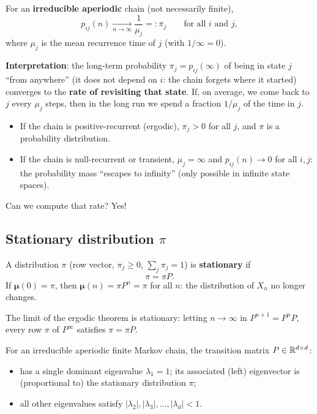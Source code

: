 \begin{theorem}
For an \textbf{irreducible aperiodic} chain (not necessarily finite),
\[
p_{ij}(n) \xrightarrow[n\to\infty]{} \frac{1}{\mu_j} =: \pi_j \qquad \text{for all } i \text{ and } j,
\]
where $\mu_j$ is the mean recurrence time of $j$ (with $1/\infty = 0$).
\end{theorem}

\textbf{Interpretation}: the long-term probability $\pi_j = p_{ij}(\infty)$ of being in state $j$ ``from anywhere'' (it does not depend on $i$: the chain forgets where it started) converges to the \textbf{rate of revisiting that state}. If, on average, we come back to $j$ every $\mu_j$ steps, then in the long run we spend a fraction $1/\mu_j$ of the time in $j$.
\begin{itemize}
    \item If the chain is positive-recurrent (ergodic), $\pi_j > 0$ for all $j$, and $\pi$ is a probability distribution.
    \item If the chain is null-recurrent or transient, $\mu_j = \infty$ and $p_{ij}(n) \to 0$ for all $i, j$: the probability mass ``escapes to infinity'' (only possible in infinite state spaces).
\end{itemize}

Can we compute that rate? Yes!

\subsection{Stationary distribution $\pi$}

\begin{definition}
A distribution $\pi$ (row vector, $\pi_j \geq 0$, $\sum_j \pi_j = 1$) is \textbf{stationary} if
\[
\pi = \pi P.
\]
If $\boldsymbol{\mu}(0) = \pi$, then $\boldsymbol{\mu}(n) = \pi P^n = \pi$ for all $n$: the distribution of $X_n$ no longer changes.
\end{definition}

The limit of the ergodic theorem is stationary: letting $n \to \infty$ in $P^{n+1} = P^n P$, every row $\pi$ of $P^\infty$ satisfies $\pi = \pi P$.

\begin{theorem}
For an irreducible aperiodic finite Markov chain, the transition matrix $P \in \mathbb{R}^{d\times d}$:
\begin{itemize}
    \item has a single dominant eigenvalue $\lambda_1 = 1$; its associated (left) eigenvector is (proportional to) the stationary distribution $\pi$;
    \item all other eigenvalues satisfy $|\lambda_2|, |\lambda_3|, \dots, |\lambda_d| < 1$.
\end{itemize}
\end{theorem}


